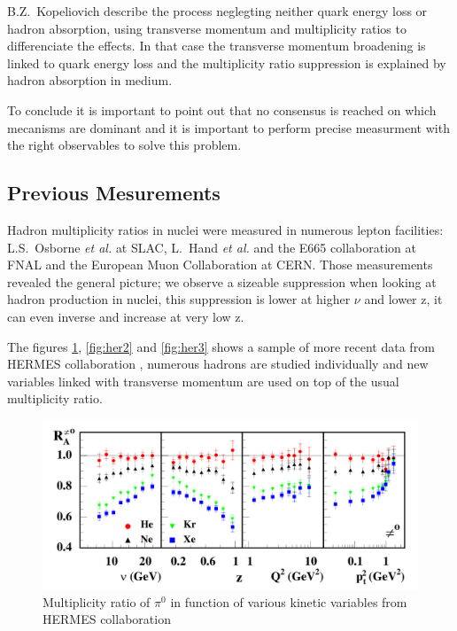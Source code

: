 B.Z.~Kopeliovich \cite{Kopeliovich:2008uy} describe the process neglegting neither quark 
energy loss or hadron absorption, using transverse momentum and
multiplicity ratios to differenciate the effects. In that case the transverse 
momentum broadening is linked to quark energy loss and the multiplicity ratio
suppression is explained by hadron absorption in medium.

To conclude it is important to point out that no consensus is reached on which 
mecanisms are dominant and it is important to perform precise measurment with
the right observables to solve this problem.


\subsection{Previous Mesurements}
\label{sec:exp}

Hadron multiplicity ratios in nuclei were measured in numerous lepton 
facilities: L.S.~Osborne {\it et al.} \cite{Osborne:1978ai} at SLAC,
L.~Hand {\it et al.} \cite{Hand:1978tx} and the E665 collaboration \cite{Adams:1994ri} at FNAL
and the European Muon Collaboration \cite{Arvidson:1984fz,Ashman:1991cx} at CERN. Those 
measurements revealed the general picture; we observe a sizeable suppression when
looking at hadron production in nuclei, this suppression is lower at higher
$\nu$ and lower z, it can even inverse and increase at very low z. 

The figures \ref{fig:her1}, \ref{fig:her2} and \ref{fig:her3} shows a sample of 
more recent data from HERMES collaboration \cite{Airapetian:2007vu}, numerous 
hadrons are studied individually and new variables linked with transverse 
momentum are used on top of the usual multiplicity ratio.

\begin{figure}[htbp]
\centering
\includegraphics[width=14cm] {fig/Hermes/pi0hermes.png} 
\caption {Multiplicity ratio of $\pi^0$ in function of various kinetic 
variables from HERMES collaboration \cite{Airapetian:2003mi}}
\label{fig:her1}
\end{figure}

